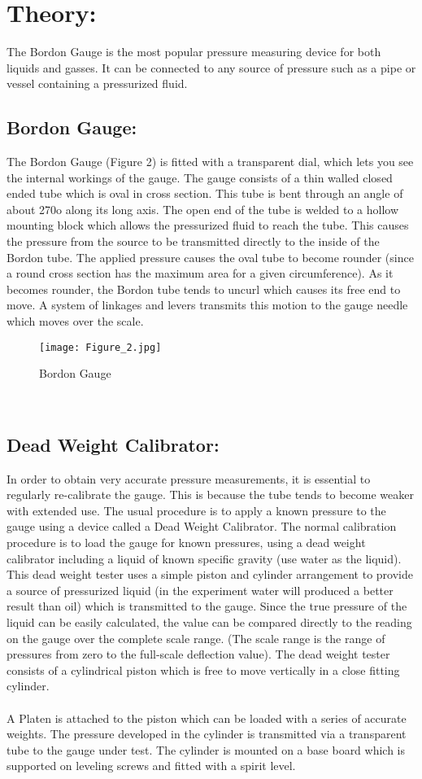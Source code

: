 \documentclass[12pt,a4paper]{article}
\begin{document}
\section{Theory:}
The Bordon Gauge is the most popular pressure measuring device for both liquids and gasses. It can be connected to any source of pressure such as a pipe or vessel containing a pressurized fluid. 
\subsection{Bordon Gauge:}
The Bordon Gauge (Figure 2) is fitted with a transparent dial, which lets you see the internal workings of the gauge. The gauge consists of a thin walled closed ended tube which is oval in cross section. This tube is bent through an angle of about 270o along its long axis. The open end of the tube is welded to a hollow mounting block which allows the pressurized fluid to reach the tube. This causes the pressure from the source to be transmitted directly to the inside of the Bordon tube. The applied pressure causes the oval tube to become rounder (since a round cross section has the maximum area for a given circumference). As it becomes rounder, the Bordon tube tends to uncurl which causes its free end to move. A system of linkages and levers transmits this motion to the gauge needle which moves over the scale.
\begin{figure}[!ht]
	\begin{center}
			\texttt{[image: Figure\_2.jpg]}
	\end{center}
	\caption{Bordon Gauge }
\end{figure}\
\subsection{Dead Weight Calibrator:}
In order to obtain very accurate pressure measurements, it is essential to regularly re-calibrate the gauge. This is because the tube tends to become weaker with extended use. The usual procedure is to apply a known pressure to the gauge using a device called a Dead Weight Calibrator. The normal calibration procedure is to load the gauge for known pressures, using a dead weight calibrator including a liquid of known specific gravity (use water as the liquid). This dead weight tester uses a simple piston and cylinder arrangement to provide a source of pressurized liquid (in the experiment water will produced a better result than oil) which is transmitted to the gauge. Since the true pressure of the liquid can be easily calculated, the value can be compared directly to the reading on the gauge over the complete scale range. (The scale range is the range of pressures from zero to the full-scale deflection value). The dead weight tester consists of a cylindrical piston which is free to move vertically in a close fitting cylinder. \\
\\A Platen is attached to the piston which can be loaded with a series of accurate weights. The pressure developed in the cylinder is transmitted via a transparent tube to the gauge under test. The cylinder is mounted on a base board which is supported on leveling screws and fitted with a spirit level.\\
\end{document}
